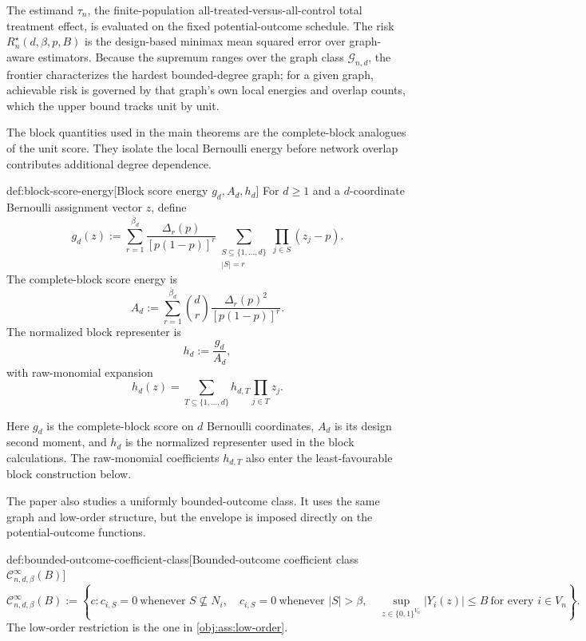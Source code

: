 \documentclass[11pt]{article}
\begin{document}
The estimand \(\tau_n\), the finite-population all-treated-versus-all-control total treatment effect, is evaluated on the fixed potential-outcome schedule. The risk \(R_n^\star(d,\beta,p,B)\) is the design-based minimax mean squared error over graph-aware estimators. Because the supremum ranges over the graph class \(\mathcal G_{n,d}\), the frontier characterizes the hardest bounded-degree graph; for a given graph, achievable risk is governed by that graph's own local energies and overlap counts, which the upper bound tracks unit by unit.

The block quantities used in the main theorems are the complete-block analogues of the unit score. They isolate the local Bernoulli energy before network overlap contributes additional degree dependence.

\begin{definitionv}{def:block-score-energy}[Block score energy \(g_d,A_d,h_d\)]
For \(d\ge 1\) and a \(d\)-coordinate Bernoulli assignment vector \(z\), define
\[
g_d(z)
:=
\sum_{r=1}^{\bar\beta_d}
\frac{\Delta_r(p)}{[p(1-p)]^r}
\sum_{\substack{S\subseteq\{1,\ldots,d\}\\ |S|=r}}
\prod_{j\in S}(z_j-p).
\]
The complete-block score energy is
\[
A_d
:=
\sum_{r=1}^{\bar\beta_d}
\binom{d}{r}
\frac{\Delta_r(p)^2}{[p(1-p)]^r}.
\]
The normalized block representer is
\[
h_d:=\frac{g_d}{A_d},
\]
with raw-monomial expansion
\[
h_d(z)=
\sum_{T\subseteq\{1,\ldots,d\}}
h_{d,T}\prod_{j\in T}z_j .
\]
\end{definitionv}

Here \(g_d\) is the complete-block score on \(d\) Bernoulli coordinates, \(A_d\) is its design second moment, and \(h_d\) is the normalized representer used in the block calculations. The raw-monomial coefficients \(h_{d,T}\) also enter the least-favourable block construction below.

The paper also studies a uniformly bounded-outcome class. It uses the same graph and low-order structure, but the envelope is imposed directly on the potential-outcome functions.

\begin{definitionv}{def:bounded-outcome-coefficient-class}[Bounded-outcome coefficient class $\mathcal C_{n,d,\beta}^{\infty}(B)$]
\[
\mathcal C_{n,d,\beta}^{\infty}(B)
:=
\left\{
c:
 c_{i,S}=0\ \text{whenever } S\not\subseteq N_i,\quad
 c_{i,S}=0\ \text{whenever } |S|>\beta,\quad
\sup_{z\in\{0,1\}^{V_n}} |Y_i(z)|\le B\ \text{for every } i\in V_n
\right\}.
\]
The low-order restriction is the one in \cref{obj:ass:low-order}.
\end{definitionv}
\end{document}
